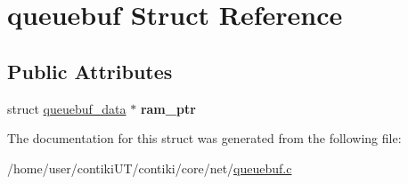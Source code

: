 \hypertarget{structqueuebuf}{}\section{queuebuf Struct Reference}
\label{structqueuebuf}
\subsection*{Public Attributes}
\begin{DoxyCompactItemize}
\item 
\hypertarget{structqueuebuf_a697365ce6a784d9160355a839ab90921}{}struct \hyperlink{structqueuebuf__data}{queuebuf\+\_\+data} $\ast$ {\bfseries ram\+\_\+ptr}\label{structqueuebuf_a697365ce6a784d9160355a839ab90921}

\end{DoxyCompactItemize}


The documentation for this struct was generated from the following file\+:\begin{DoxyCompactItemize}
\item 
/home/user/contiki\+U\+T/contiki/core/net/\hyperlink{queuebuf_8c}{queuebuf.\+c}\end{DoxyCompactItemize}
